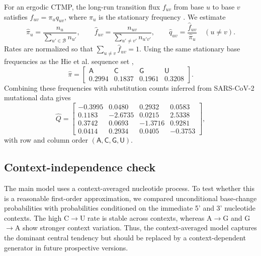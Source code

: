 \documentclass{article}
\numberwithin{theorem}{section}
\begin{document}
For an ergodic CTMP, the long-run transition flux $f_{uv}$ from base $u$ to base
$v$ satisfies $f_{uv}=\pi_u q_{uv}$, where $\pi_u$ is the stationary frequency
\cite{norris1998markov}. We estimate
\begin{equation}
    \hat{\pi}_u=\frac{n_u}{\sum_{u'\in\mathcal{B}}n_{u'}},
    \qquad
    \hat f_{uv}=\frac{n_{uv}}{\sum_{u'\neq v'}n_{u'v'}},
    \qquad
    \hat q_{uv}=\frac{\hat f_{uv}}{\hat\pi_u}
    \quad (u\neq v).
    \label{eq:supp-q-estimator}
\end{equation}
Rates are normalized so that $\sum_{u\neq v}\hat f_{uv}=1$. Using the same
stationary base frequencies as the Hie et al. sequence set \cite{hie2021learning},
\begin{equation}
    \hat{\pi}
    =
    \begin{bmatrix}
    \mathsf{A} & \mathsf{C} & \mathsf{G} & \mathsf{U} \\
    0.2994 & 0.1837 & 0.1961 & 0.3208
    \end{bmatrix}.
\end{equation}
Combining these frequencies with substitution counts inferred from SARS-CoV-2
mutational data \cite{Yi2021Mutational} gives
\begin{equation}
    \hat Q
    =
    \begin{bmatrix}
    -0.3995 & 0.0480 & 0.2932 & 0.0583 \\
     0.1183 &-2.6735 & 0.0215 & 2.5338 \\
     0.3742 & 0.0693 &-1.3716 & 0.9281 \\
     0.0414 & 0.2934 & 0.0405 &-0.3753
    \end{bmatrix},
    \label{eq:supp-q-matrix}
\end{equation}
with row and column order $(\mathsf{A},\mathsf{C},\mathsf{G},\mathsf{U})$.

\subsection{Context-independence check}

The main model uses a context-averaged nucleotide process. To test whether this
is a reasonable first-order approximation, we compared unconditional base-change
probabilities with probabilities conditioned on the immediate 5' and 3'
nucleotide contexts. The high C$\to$U rate is stable across contexts, whereas
A$\to$G and G$\to$A show stronger context variation. Thus, the context-averaged
model captures the dominant central tendency but should be replaced by a
context-dependent generator in future prospective versions.
\end{document}
